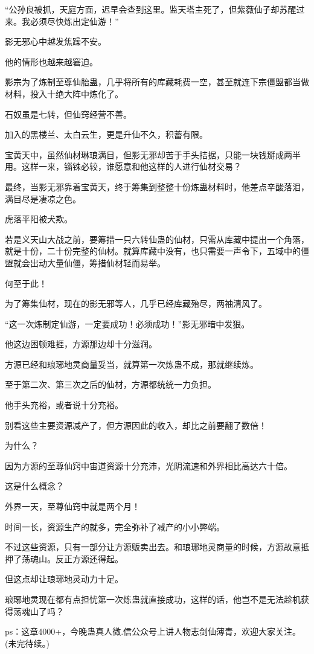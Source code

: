 \begin{this_body}
“公孙良被抓，天庭方面，迟早会查到这里。监天塔主死了，但紫薇仙子却苏醒过来。我必须尽快炼出定仙游！”

影无邪心中越发焦躁不安。

他的情形也越来越窘迫。

影宗为了炼制至尊仙胎蛊，几乎将所有的库藏耗费一空，甚至就连下宗僵盟都当做材料，投入十绝大阵中炼化了。

石奴虽是七转，但仙窍经营不善。

加入的黑楼兰、太白云生，更是升仙不久，积蓄有限。

宝黄天中，虽然仙材琳琅满目，但影无邪却苦于手头拮据，只能一块钱掰成两半用。这样一来，锱铢必较，谁愿意和他这样的人进行仙材交易？

最终，当影无邪靠着宝黄天，终于筹集到整整十份炼蛊材料时，他差点辛酸落泪，满目尽是凄凉之色。

虎落平阳被犬欺。

若是义天山大战之前，要筹措一只六转仙蛊的仙材，只需从库藏中提出一个角落，就是十份，二十份完整的仙材。就算库藏中没有，也只需要一声令下，五域中的僵盟就会出动大量仙僵，筹措仙材轻而易举。

何至于此！

为了筹集仙材，现在的影无邪等人，几乎已经库藏殆尽，两袖清风了。

“这一次炼制定仙游，一定要成功！必须成功！”影无邪暗中发狠。

他这边困顿难捱，方源那边却十分滋润。

方源已经和琅琊地灵商量妥当，就算第一次炼蛊不成，那就继续炼。

至于第二次、第三次之后的仙材，方源都统统一力负担。

他手头充裕，或者说十分充裕。

别看这些主要资源减产了，但方源因此的收入，却比之前要翻了数倍！

为什么？

因为方源的至尊仙窍中宙道资源十分充沛，光阴流速和外界相比高达六十倍。

这是什么概念？

外界一天，至尊仙窍中就是两个月！

时间一长，资源生产的就多，完全弥补了减产的小小弊端。

不过这些资源，只有一部分让方源贩卖出去。和琅琊地灵商量的时候，方源故意抵押了荡魂山。反正方源还得起。

但这点却让琅琊地灵动力十足。

琅琊地灵现在都有点担忧第一次炼蛊就直接成功，这样的话，他岂不是无法趁机获得荡魂山了吗？

ps：这章4000+，今晚蛊真人微.信公众号上讲人物志剑仙薄青，欢迎大家关注。(未完待续。)

\end{this_body}

